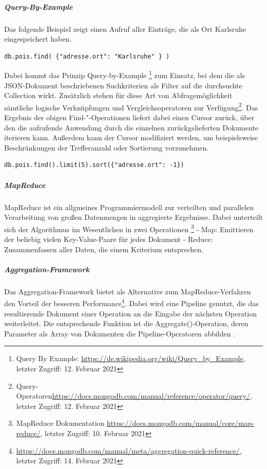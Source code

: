 \noindent
\subparagraph{Query-By-Example}
Das folgende Beispiel zeigt einen Aufruf aller Einträge, die als Ort Karlsruhe eingespeichert haben. 
\newline
\begin{lstlisting}[caption=MongoDB Read, label=lst:MongoDBRead]
db.pois.find( {"adresse.ort": "Karlsruhe" } )
\end{lstlisting}

\noindent
Dabei kommt das Prinzip Query-by-Example \footnote{Query By Example: \url{https://de.wikipedia.org/wiki/Query_by_Example}, letzter Zugriff: 12. Februar 2021} zum Einsatz, bei dem die als JSON-Dokument beschriebenen Suchkriterien als Filter auf die durchsuchte Collection wirkt. Zusätzlich stehen für diese Art von Abfragemöglichkeit sämtliche logische Verknüpfungen und Vergleichsoperatoren zur Verfügung\footnote{Query-Operatoren\url{https://docs.mongodb.com/manual/reference/operator/query/}, letzter Zugriff: 12. Februar 2021}.
Das Ergebnis der obigen Find-"-Operationen liefert dabei einen Cursor zurück, über den die aufrufende Anwendung durch die einzelnen zurückgelieferten Dokumente iterieren kann. Außerdem kann der Cursor modifiziert werden, um beispielsweise Beschränkungen der Trefferanzahl oder Sortierung vorzunehmen.
\newline
\begin{lstlisting}[caption=MongoDB Read Modifikation, label=lst:MongoDBReadModifikation]
db.pois.find().limit(5).sort({"adresse.ort": -1})
\end{lstlisting}

\noindent
\subparagraph{MapReduce}
MapReduce ist ein allgmeines Programmiermodell zur verteilten und parallelen Verarbeitung von großen Datenmengen in aggregierte Ergebnisse. Dabei unterteilt sich der Algorithmus im Wesentlichen in zwei Operationen \footnote{MapReduce Dokumentation \url{https://docs.mongodb.com/manual/core/map-reduce/}, letzter Zugriff: 10. Februar 2021}
\newline
-	Map: Emittieren der beliebig vielen Key-Value-Paare für jedes Dokument
\newline
-	Reduce: Zusammenfassen aller Daten, die einem Kriterium entsprechen.

\noindent
\subparagraph{Aggregation-Framework}
Das Aggregation-Framework bietet als Alternative zum MapReduce-Verfahren den Vorteil der besseren Performance\footnote{\url{https://docs.mongodb.com/manual/meta/aggregation-quick-reference/}, letzter Zugriff: 14. Februar 2021}. Dabei wird eine Pipeline genutzt, die das resultierende Dokument einer Operation an die Eingabe der nächsten Operation weiterleitet. Die entsprechende Funktion ist die Aggregate()-Operation, deren Parameter als Array von Dokumenten die Pipeline-Operatoren abbilden .
\newline 


